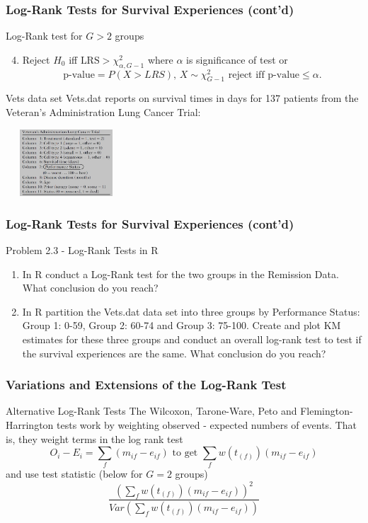 \documentclass{beamer}
\theoremstyle{definition}
\begin{document}
\begin{frame}
\frametitle{Log-Rank Tests for Survival Experiences (cont'd)}
\begin{block}{Log-Rank test for $G>2$ groups}
\begin{enumerate}
\setcounter{enumi}{3}
\item Reject $H_0$ iff $\text{LRS} > \chi^2_{\alpha,G-1}$ where $\alpha$ is significance of test or
\[
\text{p-value} = P(X>LRS), \,  X \sim \chi^2_{G-1} \text{ reject iff p-value} \le \alpha.
\]
\end{enumerate}
\end{block}
\begin{block}{Vets data set}
Vets.dat reports on survival times in days for 137 patients from the Veteran’s Administration Lung Cancer Trial:
\begin{center}
\includegraphics[width =4.5cm, height=2.5cm]{CH2_Vets}
\end{center}
\end{block}
\end{frame}
\begin{frame}
\frametitle{Log-Rank Tests for Survival Experiences (cont'd)}
\begin{block}{Problem 2.3 - Log-Rank Tests in R}
\begin{enumerate}
\item In R conduct a Log-Rank test for the two groups in the Remission Data. What conclusion do you reach?
\item In R partition the Vets.dat data set into three groups by Performance Status: Group 1: 0-59, Group 2: 60-74 and Group 3: 75-100. Create and plot KM estimates for these three groups and conduct an overall log-rank test to test if the survival experiences are the same. What conclusion do you reach?
\end{enumerate}
\end{block}
\end{frame}
\begin{frame}
\frametitle{Variations and Extensions of the Log-Rank Test}
\begin{block}{Alternative Log-Rank Tests}
The Wilcoxon, Tarone-Ware, Peto and Flemington-Harrington tests work by weighting observed - expected numbers of events. That is, they weight terms in the log rank test
\[
O_i - E_i = \sum_f (m_{if}-e_{if}) \text{ to get } \sum_f w(t_{(f)})(m_{if}-e_{if})
\]
and use test statistic (below for $G=2$ groups)
\[
\frac{\left(\sum_f w(t_{(f)}) (m_{if}-e_{if})\right)^2}{Var\left(\sum_f w(t_{(f)})(m_{if}-e_{if})\right)}
\]
\end{block}
\end{frame}
\end{document}
